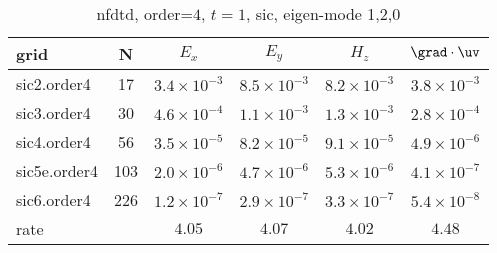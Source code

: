 \begin{table}[hbt]
\begin{center}
\begin{tabular}{|l|c|c|c|c|c|} \hline\hline 
grid  & N &  $E_x$ &  $E_y$ & $H_z$ & $\grad\cdot\uv$\\ \hline 
         sic2.order4 &    17 &  $3.4\times10^{ -3}$  &  $8.5\times10^{ -3}$  &  $8.2\times10^{ -3}$  &  $3.8\times10^{ -3}$   \\ \hline
         sic3.order4 &    30 &  $4.6\times10^{ -4}$  &  $1.1\times10^{ -3}$  &  $1.3\times10^{ -3}$  &  $2.8\times10^{ -4}$   \\ \hline
         sic4.order4 &    56 &  $3.5\times10^{ -5}$  &  $8.2\times10^{ -5}$  &  $9.1\times10^{ -5}$  &  $4.9\times10^{ -6}$   \\ \hline
        sic5e.order4 &   103 &  $2.0\times10^{ -6}$  &  $4.7\times10^{ -6}$  &  $5.3\times10^{ -6}$  &  $4.1\times10^{ -7}$   \\ \hline
         sic6.order4 &   226 &  $1.2\times10^{ -7}$  &  $2.9\times10^{ -7}$  &  $3.3\times10^{ -7}$  &  $5.4\times10^{ -8}$   \\ \hline
    rate            &     &       $4.05$ &       $4.07$ &       $4.02$ &       $4.48$  \\ \hline\hline
\end{tabular}
\caption{nfdtd, order=$4$, $t=1$, sic, eigen-mode 1,2,0}\label{table:mx.sic}
\end{center}
\end{table}

